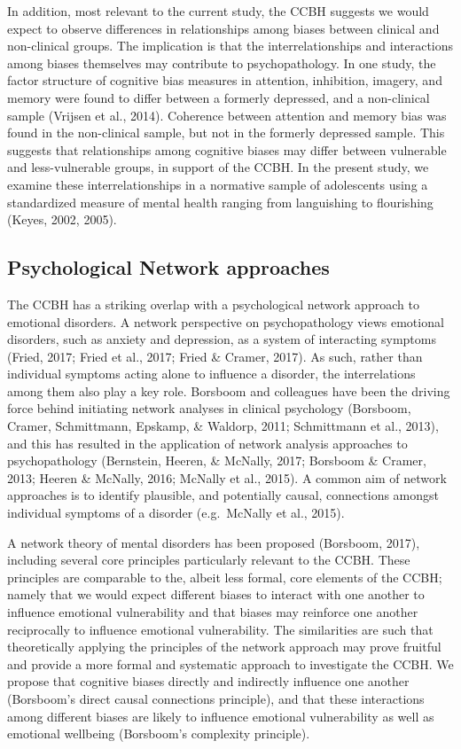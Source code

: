 \documentclass[man,floatsintext]{apa6}
\begin{document}
In addition, most relevant to the current study, the CCBH suggests we would expect to observe differences in relationships among biases between clinical and non-clinical groups. The implication is that the interrelationships and interactions among biases themselves may contribute to psychopathology. In one study, the factor structure of cognitive bias measures in attention, inhibition, imagery, and memory were found to differ between a formerly depressed, and a non-clinical sample (Vrijsen et al., 2014). Coherence between attention and memory bias was found in the non-clinical sample, but not in the formerly depressed sample. This suggests that relationships among cognitive biases may differ between vulnerable and less-vulnerable groups, in support of the CCBH. In the present study, we examine these interrelationships in a normative sample of adolescents using a standardized measure of mental health ranging from languishing to flourishing (Keyes, 2002, 2005).

\hypertarget{psychological-network-approaches}{%
\subsection{Psychological Network approaches}\label{psychological-network-approaches}}

The CCBH has a striking overlap with a psychological network approach to emotional disorders. A network perspective on psychopathology views emotional disorders, such as anxiety and depression, as a system of interacting symptoms (Fried, 2017; Fried et al., 2017; Fried \& Cramer, 2017). As such, rather than individual symptoms acting alone to influence a disorder, the interrelations among them also play a key role. Borsboom and colleagues have been the driving force behind initiating network analyses in clinical psychology (Borsboom, Cramer, Schmittmann, Epskamp, \& Waldorp, 2011; Schmittmann et al., 2013), and this has resulted in the application of network analysis approaches to psychopathology (Bernstein, Heeren, \& McNally, 2017; Borsboom \& Cramer, 2013; Heeren \& McNally, 2016; McNally et al., 2015). A common aim of network approaches is to identify plausible, and potentially causal, connections amongst individual symptoms of a disorder (e.g.~McNally et al., 2015).

A network theory of mental disorders has been proposed (Borsboom, 2017), including several core principles particularly relevant to the CCBH. These principles are comparable to the, albeit less formal, core elements of the CCBH; namely that we would expect different biases to interact with one another to influence emotional vulnerability and that biases may reinforce one another reciprocally to influence emotional vulnerability. The similarities are such that theoretically applying the principles of the network approach may prove fruitful and provide a more formal and systematic approach to investigate the CCBH. We propose that cognitive biases directly and indirectly influence one another (Borsboom's direct causal connections principle), and that these interactions among different biases are likely to influence emotional vulnerability as well as emotional wellbeing (Borsboom's complexity principle).
\end{document}
